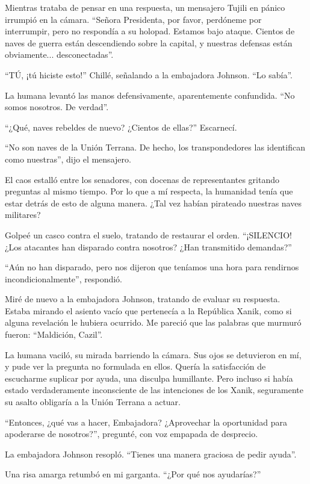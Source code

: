 \documentclass[spanish,12pt,a4paper,oneside,titlepage]{book}
\begin{document}
    Mientras trataba de pensar en una respuesta, un mensajero Tujili en pánico irrumpió en la cámara. ``Señora Presidenta, por favor, perdóneme por interrumpir, pero no respondía a su holopad. Estamos bajo ataque. Cientos de naves de guerra están descendiendo sobre la capital, y nuestras defensas están obviamente... desconectadas''.

    ``TÚ, ¡tú hiciste esto!'' Chillé, señalando a la embajadora Johnson. ``Lo sabía''.

    La humana levantó las manos defensivamente, aparentemente confundida. ``No somos nosotros. De verdad''.

    ``¿Qué, naves rebeldes de nuevo? ¿Cientos de ellas?'' Escarnecí.

    ``No son naves de la Unión Terrana. De hecho, los transpondedores las identifican como nuestras'', dijo el mensajero.

    El caos estalló entre los senadores, con docenas de representantes gritando preguntas al mismo tiempo. Por lo que a mí respecta, la humanidad tenía que estar detrás de esto de alguna manera. ¿Tal vez habían pirateado nuestras naves militares?

    Golpeé un casco contra el suelo, tratando de restaurar el orden. ``¡SILENCIO! ¿Los atacantes han disparado contra nosotros? ¿Han transmitido demandas?''

    ``Aún no han disparado, pero nos dijeron que teníamos una hora para rendirnos incondicionalmente'', respondió.

    Miré de nuevo a la embajadora Johnson, tratando de evaluar su respuesta. Estaba mirando el asiento vacío que pertenecía a la República Xanik, como si alguna revelación le hubiera ocurrido. Me pareció que las palabras que murmuró fueron: ``Maldición, Cazil''.

    La humana vaciló, su mirada barriendo la cámara. Sus ojos se detuvieron en mí, y pude ver la pregunta no formulada en ellos. Quería la satisfacción de escucharme suplicar por ayuda, una disculpa humillante. Pero incluso si había estado verdaderamente inconsciente de las intenciones de los Xanik, seguramente su asalto obligaría a la Unión Terrana a actuar.

    ``Entonces, ¿qué vas a hacer, Embajadora? ¿Aprovechar la oportunidad para apoderarse de nosotros?'', pregunté, con voz empapada de desprecio.

    La embajadora Johnson resopló. ``Tienes una manera graciosa de pedir ayuda''.

    Una risa amarga retumbó en mi garganta. ``¿Por qué nos ayudarías?''
\end{document}
